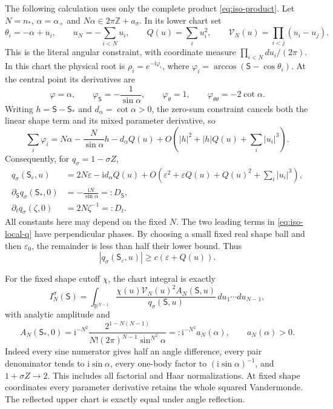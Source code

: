 \documentclass[11pt]{article}
\numberwithin{equation}{section}
\theoremstyle{definition}
\newcommand{\R}{\mathbb R}
\newcommand{\Z}{\mathbb Z}
\newcommand{\ii}{\mathrm i}
\newcommand{\eps}{\varepsilon}
\begin{document}
The following calculation uses only the complete product
\eqref{eq:iso-product}.  Let $N=n_*$, $\alpha=\alpha_+$ and
$N\alpha\in2\pi\Z+a_\sigma$.
In its lower chart set
\[
 \theta_i=-\alpha+u_i,\qquad
 u_N=-\sum_{i<N}u_i,\qquad Q(u)=\sum_i u_i^2,
 \qquad \mathcal V_N(u)=\prod_{i<j}(u_i-u_j).
\]
This is the literal angular constraint, with coordinate measure
$\prod_{i<N}du_i/(2\pi)$.  In this chart the physical root is
$\rho_i=e^{-\ii\varphi_i}$, where
$\varphi_i=\arccos(\mathsf S-\cos\theta_i)$.
At the central point its derivatives are
\[
 \varphi=\alpha,\qquad
 \varphi_{\mathsf S}=-\frac1{\sin\alpha},\qquad
 \varphi_\theta=1,\qquad
 \varphi_{\theta\theta}=-2\cot\alpha.
\]
Writing $h=\mathsf S-\mathsf S_*$ and $d_\alpha=\cot\alpha>0$,
the zero-sum constraint cancels both the linear shape term and its
mixed parameter derivative, so
\[
 \sum_i\varphi_i
 =N\alpha-\frac{N}{\sin\alpha}h-d_\alpha Q(u)
   +O\left(|h|^2+|h|Q(u)+\sum_i|u_i|^3\right).
\]
Consequently, for $q_\sigma=1-\sigma Z$,
\begin{align}
 q_\sigma(\mathsf S_\eps,u)
   &=2N\eps-\ii d_\alpha Q(u)
     +O\left(\eps^2+\eps Q(u)+Q(u)^2+
                                  \sum_i|u_i|^3\right),
                                  \label{eq:iso-local-q}\\
 \partial_{\mathsf S}q_\sigma(\mathsf S_*,0)
   &=-\frac{\ii N}{\sin\alpha}=:D_{\mathsf S},
                                  \label{eq:iso-local-derivative}\\
 \partial_t q_\sigma(\zeta,0)&=2N\zeta^{-1}=:D_t.\nonumber
\end{align}
All constants here may depend on the fixed $N$.  The two leading
terms in \eqref{eq:iso-local-q} have perpendicular phases.  By choosing
a small fixed real shape ball and then $\eps_0$, the remainder is
less than half their lower bound.  Thus
\begin{equation}\label{eq:iso-local-lower}
 |q_\sigma(\mathsf S_\eps,u)|\ge c(\eps+Q(u)).
\end{equation}

For the fixed shape cutoff $\chi$, the chart integral is exactly
\begin{equation}\label{eq:iso-shape-integral}
 I_N^\sigma(\mathsf S)=
   \int_{\R^{N-1}}
     \frac{\chi(u)\mathcal V_N(u)^2 A_N(\mathsf S,u)}
          {q_\sigma(\mathsf S,u)}\,du_1\cdots du_{N-1},
\end{equation}
with analytic amplitude and
\begin{equation}\label{eq:iso-exact-amplitude}
 A_N(\mathsf S_*,0)
 =\ii^{-N^2}
     \frac{2^{1-N(N-1)}}
          {N!(2\pi)^{N-1}\sin^{N^2}\alpha}
 =:\ii^{-N^2}a_N(\alpha),\qquad a_N(\alpha)>0.
\end{equation}
Indeed every sine numerator gives half an angle difference, every
pair denominator tends to $\ii\sin\alpha$, every one-body factor
to $(\ii\sin\alpha)^{-1}$, and $1+\sigma Z\to2$.
This includes all factorial and Haar normalizations.
At fixed shape coordinates every parameter derivative retains the
whole squared Vandermonde.  The reflected upper chart is exactly
equal under angle reflection.
\end{document}
